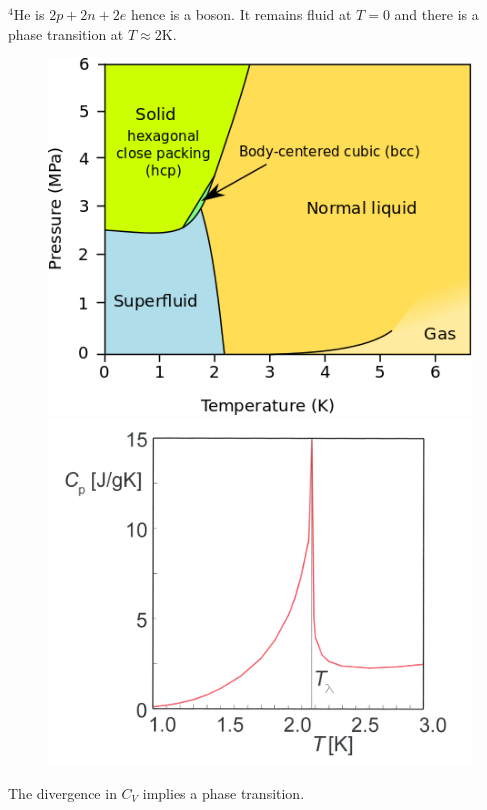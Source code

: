 \documentclass[a4paper, 11pt, normalem]{report}
\begin{document}
\begin{example}
    $^4$He is $2p + 2n + 2e$ hence is a boson.
    It remains fluid at $T=0$ and there is a phase transition at $T\approx 2$K.
    \begin{figure}[H]
        \centering
        \includegraphics[scale=0.4]{he4.png}
        \includegraphics[scale=0.4]{h4cv.jpg}
    \end{figure}
    The divergence in $C_V$ implies a phase transition.
\end{example}

\chapter{}
\end{document}
